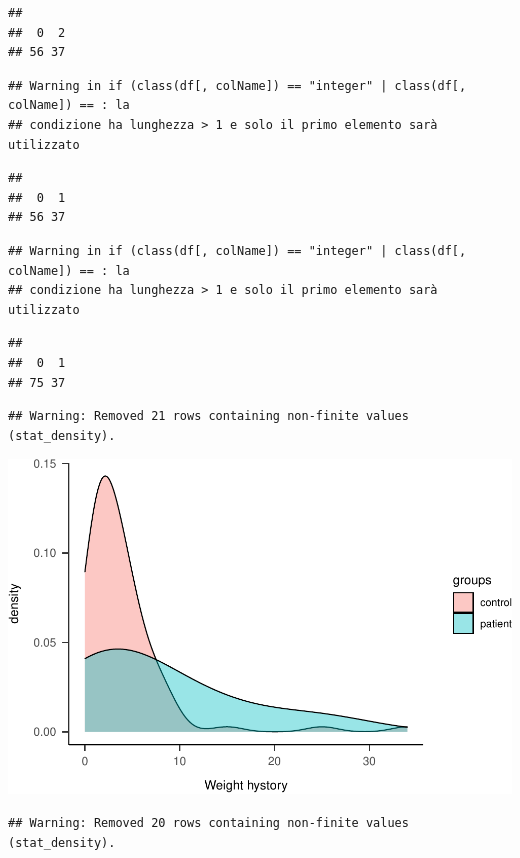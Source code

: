 \documentclass[
]{article}
\begin{document}
\begin{verbatim}
## 
##  0  2 
## 56 37
\end{verbatim}

\begin{verbatim}
## Warning in if (class(df[, colName]) == "integer" | class(df[, colName]) == : la
## condizione ha lunghezza > 1 e solo il primo elemento sarà utilizzato
\end{verbatim}

\begin{verbatim}
## 
##  0  1 
## 56 37
\end{verbatim}

\begin{verbatim}
## Warning in if (class(df[, colName]) == "integer" | class(df[, colName]) == : la
## condizione ha lunghezza > 1 e solo il primo elemento sarà utilizzato
\end{verbatim}

\begin{verbatim}
## 
##  0  1 
## 75 37
\end{verbatim}

\begin{verbatim}
## Warning: Removed 21 rows containing non-finite values (stat_density).
\end{verbatim}

\includegraphics{046_weight_history_alpha_files/figure-latex/unnamed-chunk-3-1.pdf}

\begin{verbatim}
## Warning: Removed 20 rows containing non-finite values (stat_density).
\end{verbatim}
\end{document}
